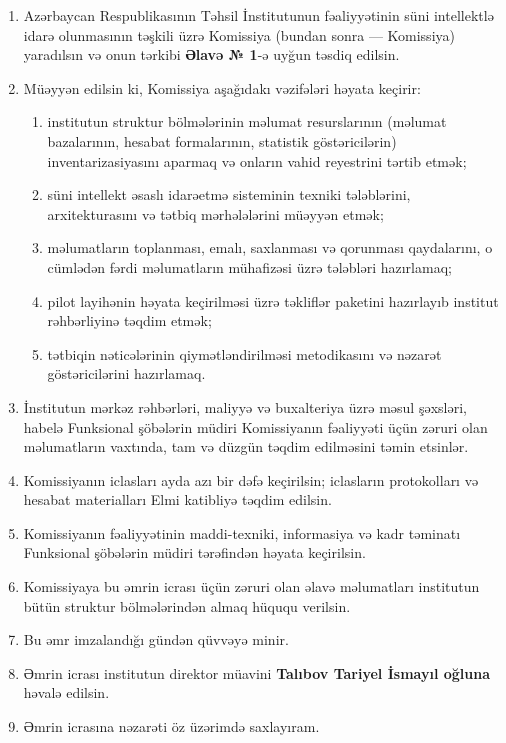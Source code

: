 \documentclass[12pt,a4paper]{article}
\begin{document}
\begin{enumerate}[leftmargin=18pt,itemsep=6pt,topsep=2pt]

\item Azərbaycan Respublikasının Təhsil İnstitutunun fəaliyyətinin süni
intellektlə idarə olunmasının təşkili üzrə Komissiya (bundan sonra ---
Komissiya) yaradılsın və onun tərkibi \textbf{Əlavə № 1}-ə uyğun təsdiq
edilsin.

\item Müəyyən edilsin ki, Komissiya aşağıdakı vəzifələri həyata keçirir:

  \begin{enumerate}[label=\arabic{enumi}.\arabic*.,leftmargin=28pt,itemsep=3pt,topsep=3pt]
    \item institutun struktur bölmələrinin məlumat resurslarının
      (məlumat bazalarının, hesabat formalarının, statistik göstəricilərin)
      inventarizasiyasını aparmaq və onların vahid reyestrini tərtib etmək;
    \item süni intellekt əsaslı idarəetmə sisteminin texniki tələblərini,
      arxitekturasını və tətbiq mərhələlərini müəyyən etmək;
    \item məlumatların toplanması, emalı, saxlanması və qorunması qaydalarını,
      o cümlədən fərdi məlumatların mühafizəsi üzrə tələbləri hazırlamaq;
    \item pilot layihənin həyata keçirilməsi üzrə təkliflər paketini
      hazırlayıb institut rəhbərliyinə təqdim etmək;
    \item tətbiqin nəticələrinin qiymətləndirilməsi metodikasını və
      nəzarət göstəricilərini hazırlamaq.
  \end{enumerate}

\item İnstitutun mərkəz rəhbərləri, maliyyə və buxalteriya üzrə məsul
şəxsləri, habelə Funksional şöbələrin müdiri Komissiyanın fəaliyyəti üçün
zəruri olan məlumatların vaxtında, tam və düzgün təqdim edilməsini təmin
etsinlər.

\item Komissiyanın iclasları ayda azı bir dəfə keçirilsin; iclasların
protokolları və hesabat materialları Elmi katibliyə təqdim edilsin.

\item Komissiyanın fəaliyyətinin maddi-texniki, informasiya və kadr
təminatı Funksional şöbələrin müdiri tərəfindən həyata keçirilsin.

\item Komissiyaya bu əmrin icrası üçün zəruri olan əlavə məlumatları
institutun bütün struktur bölmələrindən almaq hüququ verilsin.

\item Bu əmr imzalandığı gündən qüvvəyə minir.

\item Əmrin icrası institutun direktor müavini
\textbf{Talıbov Tariyel İsmayıl oğluna} həvalə edilsin.

\item Əmrin icrasına nəzarəti öz üzərimdə saxlayıram.

\end{enumerate}
\end{document}
